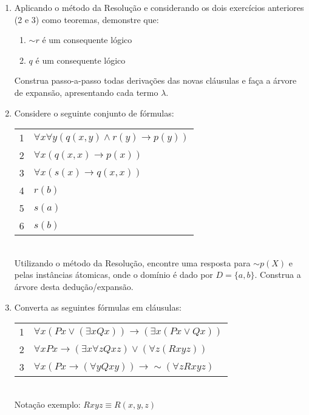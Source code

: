 \documentclass[10pt, a4paper,final]{article}
\begin{document}
\begin{enumerate}
\item Aplicando o método da Resolução e considerando os dois exercícios anteriores (2 e 3) como teoremas,  demonstre que:
\begin{enumerate}
\setlength{\itemsep}{-2pt}
\item $\sim r $ é um consequente lógico
\item $ q $ é um consequente lógico
\end{enumerate}

Construa passo-a-passo todas derivaç\~oes das novas cláusulas e faça a  árvore de expansão,  apresentando cada termo $\lambda$.


\item Considere o seguinte conjunto de f\'ormulas: \\

\begin{tabular}{ll}
1 &  $\forall x\forall y (q(x,y) \wedge r(y) \rightarrow p(y)) $ \\
2 &  $\forall x (q(x,x) \rightarrow p(x))  $ \\
3 &  $\forall x (s(x) \rightarrow q(x,x)) $ \\
4 &  $r(b)$ \\ 
5 &  $s(a)$ \\
6 &  $s(b)$ \\
\end{tabular}\\
Utilizando o método da Resolução, encontre uma resposta para $\sim p(X)$ e
pelas instâncias átomicas, onde o domínio é dado por $D=\{a,b\}$. Construa 
a árvore desta dedução/expansão.

\item Converta as seguintes fórmulas em cláusulas:
\begin{tabular}{ll}
1 &  $ \forall x (Px \vee (\exists x Qx )) \rightarrow (\exists x (Px \vee Qx )) $ \\
2 &  $ \forall x Px  \rightarrow (\exists x  \forall z Qxz ) \vee (\forall z (Rxyz))$ \\
3 &  $ \forall x (Px \rightarrow (\forall y Qxy )) \rightarrow \sim (\forall z  Rxyz ) $ \\
\end{tabular}\\
Notação exemplo: $Rxyz \equiv R(x,y,z)$


\end{enumerate}
\end{document}
